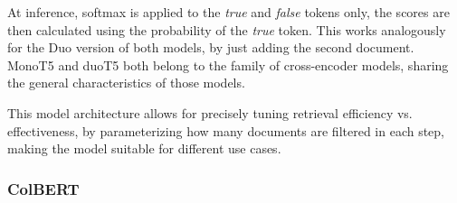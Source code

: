 At inference, softmax is applied to the \emph{true} and \emph{false} tokens only, the scores are then calculated using the probability of the \emph{true} token.
This works analogously for the Duo version of both models, by just adding the second document.
MonoT5 and duoT5 both belong to the family of cross-encoder models, sharing the general characteristics of those models.

This model architecture allows for precisely tuning retrieval efficiency vs. effectiveness, by parameterizing how many documents are filtered in each step, making the model suitable for different use cases.


\subsubsection{ColBERT}\label{sec:colbert}

